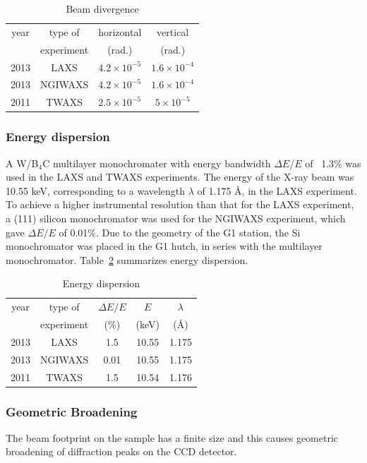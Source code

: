 \begin{table}[htbp]
  \centering
  \begin{tabular}{cccc}
    \hline
    year & type of  & horizontal & vertical \\
     & experiment & (rad.) & (rad.) \\
    \hline
    2013 & LAXS & $4.2 \times 10^{-5}$ & $1.6 \times 10^{-4}$ \\
    2013 & NGIWAXS & $4.2 \times 10^{-5}$ & $1.6 \times 10^{-4}$ \\
    2011 & TWAXS & $2.5 \times 10^{-5}$ & $5 \times 10^{-5}$ \\
    \hline
  \end{tabular}
  \caption[Beam divergence]{Beam divergence}
  \label{tb:beam_divergence}
\end{table}

\subsubsection{Energy dispersion}
A W/B$_4$C multilayer monochromater with energy bandwidth $\Delta E$/$E$ of 
~1.3\% was used in the LAXS and TWAXS experiments. 
The energy of the X-ray beam was 10.55 keV, corresponding to a wavelength 
$\lambda$ of 1.175 \AA, in the LAXS experiment.
To achieve a higher instrumental resolution than that for 
the LAXS experiment, a (111) silicon monochromator was used for 
the NGIWAXS experiment, which gave $\Delta E/E$ of 0.01\%.
Due to the geometry of the G1 station, the Si monochromator was placed in
the G1 hutch, in series with the multilayer monochromator. 
Table~\ref{tb:energy_dispersion} summarizes energy dispersion.

\begin{table}[htbp]
  \centering
  \begin{tabular}{ccccc}
    \hline
    year & type of & $\Delta E/E$ & $E$ & $\lambda$ \\
     & experiment & (\%) & (keV) & (\AA) \\
    \hline
    2013 & LAXS & 1.5 & 10.55 & 1.175 \\
    2013 & NGIWAXS & 0.01 & 10.55 & 1.175 \\
    2011 & TWAXS & 1.5 & 10.54 & 1.176 \\
    \hline
  \end{tabular}
  \caption[Energy dispersion]{Energy dispersion}
  \label{tb:energy_dispersion}
\end{table}

\subsubsection{Geometric Broadening}
The beam footprint on the sample has a finite size and this causes
geometric broadening of diffraction peaks on the CCD detector.

